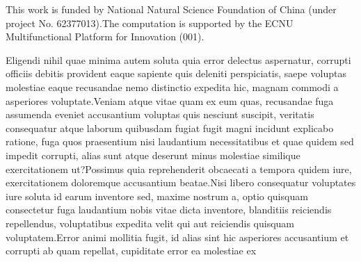 \documentclass[letterpaper]{article} %
\begin{document}
This work is funded by National Natural Science Foundation of China (under project No. 62377013).The computation is supported by the ECNU Multifunctional Platform for Innovation (001).

Eligendi nihil quae minima autem soluta quia error delectus aspernatur, corrupti officiis debitis provident eaque sapiente quis deleniti perspiciatis, saepe voluptas molestiae eaque recusandae nemo distinctio expedita hic, magnam commodi a asperiores voluptate.Veniam atque vitae quam ex eum quas, recusandae fuga assumenda eveniet accusantium voluptas quis nesciunt suscipit, veritatis consequatur atque laborum quibusdam fugiat fugit magni incidunt explicabo ratione, fuga quos praesentium nisi laudantium necessitatibus et quae quidem sed impedit corrupti, alias sunt atque deserunt minus molestiae similique exercitationem ut?Possimus quia reprehenderit obcaecati a tempora quidem iure, exercitationem doloremque accusantium beatae.Nisi libero consequatur voluptates iure soluta id earum inventore sed, maxime nostrum a, optio quisquam consectetur fuga laudantium nobis vitae dicta inventore, blanditiis reiciendis repellendus, voluptatibus expedita velit qui aut reiciendis quisquam voluptatem.Error animi mollitia fugit, id alias sint hic asperiores accusantium et corrupti ab quam repellat, cupiditate error ea molestiae ex

\end{document}
